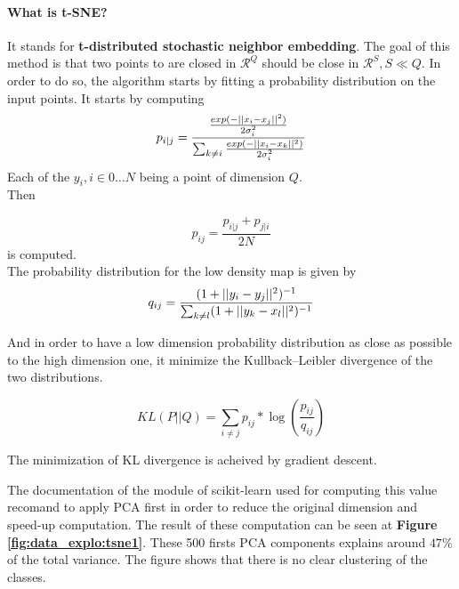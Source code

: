 \paragraph{What is t-SNE?} It stands for \textbf{t-distributed stochastic neighbor embedding}. The goal of this method is that two points to are closed in $\mathcal{R}^{Q}$ should be close in $\mathcal{R}^{S}, S \ll Q$. In order to do so, the algorithm starts by fitting a probability distribution on the input points. It starts by computing
\begin{equation*}
	p_{i|j} = \frac{\frac{exp(-||x_i - x_j||^2)}{2 \sigma_i^2}}{\sum_{k \neq i} \frac{exp(-||x_i - x_k||^2)}{2 \sigma_i^2}}\\
\end{equation*}
Each of the $y_i, i \in 0 \dots N$ being a point of dimension $Q$.\\
Then 

\begin{equation*}
	p_{ij} = \frac{p_{i|j} + p_{j|i} }{2N}
\end{equation*}
is computed. \\

The probability distribution for the low density map is given by 
\begin{equation*}
	q_{ij} = \frac{(1 + ||y_i - y_j||^2)^{-1}}{\sum_{k \neq l} (1 +||y_k - x_l||^2)^{-1}}\\
\end{equation*}

And in order to have a low dimension probability distribution as close as possible to the high dimension one, it minimize the Kullback–Leibler divergence of the two distributions. 

\begin{equation*}
	KL(P||Q) = \sum_{i \neq j} p_{ij} * \log(\frac{p_{ij}}{q_{ij}})
\end{equation*}

The minimization of KL divergence is acheived by gradient descent. 

The documentation of the module of scikit-learn\cite{scikit-learn} used for computing this value recomand to apply PCA first in order to reduce the original dimension and speed-up computation. The result of these computation can be seen at \textbf{Figure \ref{fig:data_explo:tsne1}}. These 500 firsts PCA components explains around $47\%$ of the total variance. The figure shows that there is no clear clustering of the classes. 

